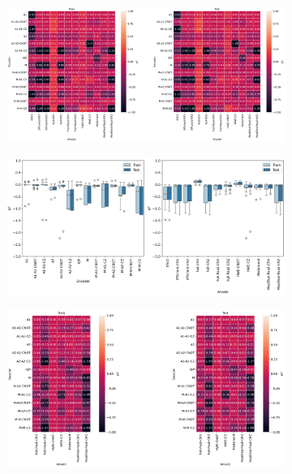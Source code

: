 \documentclass[journal=jacsat,manuscript=article]{achemso}
\begin{document}
\begin{figure}[H]
	\centering	
	\begin{subfigure}[b]{0.49\textwidth}
		\centering
		\includegraphics[width=\linewidth]{../images/BSE/fivequbit/BSE_heatplots}
		\caption{}
		\label{fig:5BSE_heatplots}
	\end{subfigure}
	\hfill
	\begin{subfigure}[b]{0.49\textwidth}
		\centering
		\includegraphics[width=\linewidth]{../images/BSE/fivequbit/BSE_boxplots}
		\caption{}
		\label{fig:5BSE_boxplots}
	\end{subfigure}
	\hfill
	\begin{subfigure}[b]{0.49\textwidth}
		\centering
		\includegraphics[width=\linewidth]{../images/BSE/sixteenqubit/BSE_heatplots}

\end{subfigure}
\end{figure}
\end{document}
